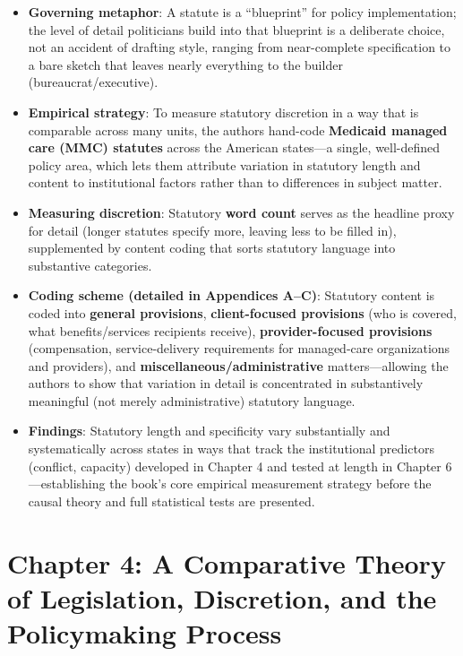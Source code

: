 \documentclass[12pt]{article}
\begin{document}
\begin{itemize}[leftmargin=*, itemsep=4pt]
    \item \textbf{Governing metaphor}: A statute is a ``blueprint'' for policy implementation; the level of detail politicians build into that blueprint is a deliberate choice, not an accident of drafting style, ranging from near-complete specification to a bare sketch that leaves nearly everything to the builder (bureaucrat/executive).
    \item \textbf{Empirical strategy}: To measure statutory discretion in a way that is comparable across many units, the authors hand-code \textbf{Medicaid managed care (MMC) statutes} across the American states---a single, well-defined policy area, which lets them attribute variation in statutory length and content to institutional factors rather than to differences in subject matter.
    \item \textbf{Measuring discretion}: Statutory \textbf{word count} serves as the headline proxy for detail (longer statutes specify more, leaving less to be filled in), supplemented by content coding that sorts statutory language into substantive categories.
    \item \textbf{Coding scheme (detailed in Appendices A--C)}: Statutory content is coded into \textbf{general provisions}, \textbf{client-focused provisions} (who is covered, what benefits/services recipients receive), \textbf{provider-focused provisions} (compensation, service-delivery requirements for managed-care organizations and providers), and \textbf{miscellaneous/administrative} matters---allowing the authors to show that variation in detail is concentrated in substantively meaningful (not merely administrative) statutory language.
    \item \textbf{Findings}: Statutory length and specificity vary substantially and systematically across states in ways that track the institutional predictors (conflict, capacity) developed in Chapter 4 and tested at length in Chapter 6---establishing the book's core empirical measurement strategy before the causal theory and full statistical tests are presented.
\end{itemize}

\section{Chapter 4: A Comparative Theory of Legislation, Discretion, and the Policymaking Process}
\end{document}
